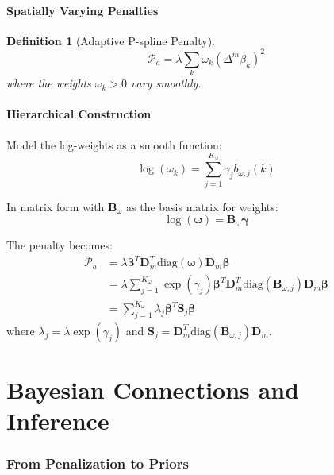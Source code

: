 \documentclass[12pt]{article}
\newtheorem{definition}{Definition}
\newcommand{\diag}{\text{diag}}
\begin{document}
\subsection{Spatially Varying Penalties}

\begin{definition}[Adaptive P-spline Penalty]
\begin{equation}
\mathcal{P}_a = \lambda \sum_{k} \omega_k (\Delta^m \beta_k)^2
\end{equation}
where the weights $\omega_k > 0$ vary smoothly.
\end{definition}

\subsection{Hierarchical Construction}

Model the log-weights as a smooth function:
\begin{equation}
\log(\omega_k) = \sum_{j=1}^{K_\omega} \gamma_j b_{\omega,j}(k)
\end{equation}

In matrix form with $\mathbf{B}_\omega$ as the basis matrix for weights:
\begin{equation}
\log(\bm{\omega}) = \mathbf{B}_\omega \bm{\gamma}
\end{equation}

The penalty becomes:
\begin{align}
\mathcal{P}_a &= \lambda \bm{\beta}^T \mathbf{D}_m^T \diag(\bm{\omega}) \mathbf{D}_m \bm{\beta} \\
&= \lambda \sum_{j=1}^{K_\omega} \exp(\gamma_j) \bm{\beta}^T \mathbf{D}_m^T \diag(\mathbf{B}_{\omega,j}) \mathbf{D}_m \bm{\beta} \\
&= \sum_{j=1}^{K_\omega} \lambda_j \bm{\beta}^T \mathbf{S}_j \bm{\beta}
\end{align}
where $\lambda_j = \lambda \exp(\gamma_j)$ and $\mathbf{S}_j = \mathbf{D}_m^T \diag(\mathbf{B}_{\omega,j}) \mathbf{D}_m$.

\part{Bayesian Connections and Inference}

\section{From Penalization to Priors}
\end{document}

